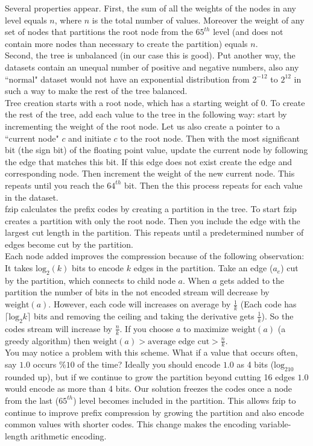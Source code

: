 \indent Several properties appear. First, the sum of all the weights of the nodes in any level equals $n$, where $n$ is the total number of values. Moreover the weight of any set of nodes that partitions the root node from the $65^{th}$ level (and does not contain more nodes than necessary to create the partition) equals $n$.\\
\indent Second, the tree is unbalanced (in our case this is good). Put another way, the datasets contain an unequal number of positive and negative numbers, also any ``normal" dataset would not have an exponential distribution from $2^{-12}$ to $2^{12}$ in such a way to make the rest of the tree balanced.\\
\indent Tree creation starts with a root node, which has a starting weight of 0. To create the rest of the tree, add each value to the tree in the following way: start by incrementing the weight of the root node. Let us also create a pointer to a ``current node" $c$ and initiate $c$ to the root node. Then with the most significant bit (the sign bit) of the floating point value, update the current node by following the edge that matches this bit. If this edge does not exist create the edge and corresponding node. Then increment the weight of the new current node. This repeats until you reach the $64^{th}$ bit. Then the this process repeats for each value in the dataset.\\ 
\indent fzip calculates the prefix codes by creating a partition in the tree. To start fzip creates a partition with only the root node. Then you include the edge with the largest cut length in the partition. This repeats until a predetermined number of edges become cut by the partition.\\
\indent Each node added improves the compression because of the following observation: It takes $\textrm{log}_2(k)$ bits to encode $k$ edges in the partition. Take an edge ($a_e$) cut by the partition, which connects to child node $a$. When $a$ gets added to the partition the number of bits in the not encoded stream will decrease by $\textrm{weight}(a)$. However, each code will increases on average by $\frac{1}{k}$ (Each code has $\lceil \textrm{log}_2k \rceil$ bits and removing the ceiling and taking the derivative gets $\frac{1}{k}$). So the codes stream will increase by $\frac{n}{k}$. If you choose $a$ to maximize $\textrm{weight}(a)$ (a greedy algorithm) then $\textrm{weight}(a) > \textrm{average edge cut} > \frac{n}{k}$.\\
\indent You may notice a problem with this scheme. What if a value that occurs often, say $1.0$ occurs $\%10$ of the time? Ideally you should encode $1.0$ as 4 bits ($\textrm{log}_210$ rounded up), but if we continue to grow the partition beyond cutting 16 edges $1.0$ would encode as more than 4 bits. Our solution freezes the codes once a node from the last ($65^{th}$) level becomes included in the partition. This allows fzip to continue to improve prefix compression by growing the partition and also encode common values with shorter codes. This change makes the encoding variable-length arithmetic encoding.\\
